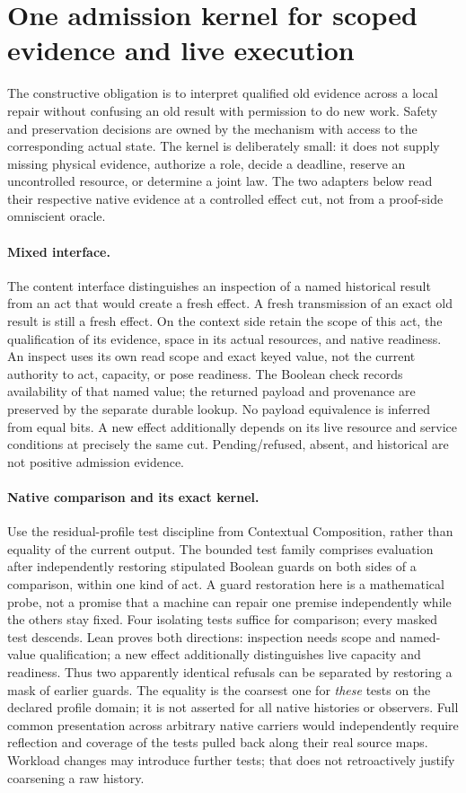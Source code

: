 \documentclass{article}
\begin{document}
\section*{One admission kernel for scoped evidence and live execution}
The constructive obligation is to interpret qualified old evidence
across a local repair without confusing an old result with
permission to do new work. Safety and preservation decisions are
owned by the mechanism with access to the corresponding actual
state. The kernel is deliberately small: it does not supply missing
physical evidence, authorize a role, decide a deadline, reserve an
uncontrolled resource, or determine a joint law. The two adapters
below read their respective native evidence at a controlled effect
cut, not from a proof-side omniscient oracle.

\paragraph{Mixed interface.}
The content interface distinguishes an inspection of a named
historical result from an act that would create a fresh effect. A
fresh transmission of an exact old result is still a fresh effect.
On the context side retain the scope of this act, the qualification
of its evidence, space in its actual resources, and native
readiness. An inspect uses its own read scope and exact keyed value,
not the current authority to act, capacity, or pose readiness. The
Boolean check records availability of that named value; the returned
payload and provenance are preserved by the separate durable
lookup. No payload equivalence is inferred from equal bits. A
new effect additionally depends on its live resource and service
conditions at precisely the same cut. Pending/refused, absent,
and historical are not positive admission evidence.

\paragraph{Native comparison and its exact kernel.}
Use the residual-profile test discipline from Contextual
Composition, rather than equality of the current output. The
bounded test family comprises evaluation after independently
restoring stipulated Boolean guards on both sides of a comparison,
within one kind of act. A guard restoration here is a mathematical
probe, not a promise that a machine can repair one premise
independently while the others stay fixed. Four isolating tests
suffice for comparison; every masked test descends. Lean proves
both directions: inspection needs scope and named-value qualification;
a new effect additionally distinguishes live capacity and readiness.
Thus two apparently identical refusals can be separated by
restoring a mask of earlier guards. The equality is the coarsest
one for \emph{these} tests on the declared profile domain; it is
not asserted for all native histories or observers. Full common
presentation across arbitrary native carriers would independently
require reflection and coverage of the tests pulled back along
their real source maps. Workload changes may introduce further
tests; that does not retroactively justify coarsening a raw history.
\end{document}
